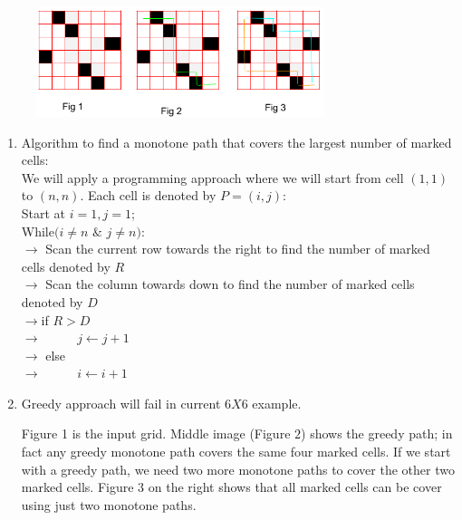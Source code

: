 \documentclass[addpoints]{exam}
\begin{document}
\begin{questions}
\begin{figure}[H]
  \centering
  \includegraphics[width=0.75\textwidth]{algo}\\
\end{figure}
\begin{solution}
\begin{enumerate}
\item
Algorithm to find a monotone path that covers the largest number of marked cells:\\
We will apply a programming approach where we will start from cell $(1,1)$ to $(n,n)$. Each cell is denoted by $P = (i,j)$:\\

Start at $i = 1, j = 1$;\\
While$(i \neq n$ $\&$ $j\neq n)$:\\
$\rightarrow$ Scan the current row towards the right to find the number of marked cells denoted by $R$\\
$\rightarrow$ Scan the column towards down to find the number of marked cells denoted by $D$\\
$\rightarrow$if $R > D$\\
$\rightarrow$	\ \ \ \ \ $j \gets j+1$\\
$\rightarrow$   else\\
$\rightarrow$	\ \ \ \ \ $i \gets i+1$\\
    
\item
Greedy approach will fail in current $6X6$ example.

Figure 1 is the input grid. Middle image (Figure $2$) shows the greedy path; in fact any greedy monotone path covers the same four marked cells. If we start with a greedy path, we need two more monotone paths to cover the other two marked cells. Figure $3$ on the right shows that all marked cells can be cover using just two monotone paths.


\end{enumerate}
\end{solution}
\end{questions}
\end{document}
